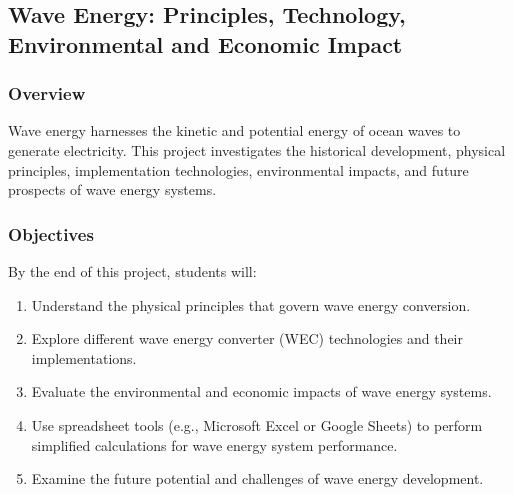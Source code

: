 \documentclass[11pt]{article}
\begin{document}
\subsection{Wave Energy: Principles, Technology, Environmental and Economic Impact}

\subsubsection*{Overview}
Wave energy harnesses the kinetic and potential energy of ocean waves to generate electricity. This project investigates the historical development, physical principles, implementation technologies, environmental impacts, and future prospects of wave energy systems.

\subsubsection*{Objectives}
By the end of this project, students will:
\begin{enumerate}
    \item Understand the physical principles that govern wave energy conversion.
    \item Explore different wave energy converter (WEC) technologies and their implementations.
    \item Evaluate the environmental and economic impacts of wave energy systems.
    \item Use spreadsheet tools (e.g., Microsoft Excel or Google Sheets) to perform simplified calculations for wave energy system performance.
    \item Examine the future potential and challenges of wave energy development.
\end{enumerate}
\end{document}
